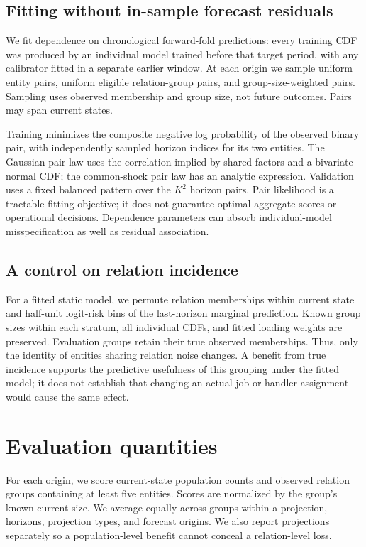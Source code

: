 \subsection{Fitting without in-sample forecast residuals}
We fit dependence on chronological forward-fold predictions: every training
CDF was produced by an individual model trained before that target period,
with any calibrator fitted in a separate earlier window. At each origin we
sample uniform entity pairs, uniform eligible relation-group pairs, and
group-size-weighted pairs. Sampling uses observed membership and group size,
not future outcomes. Pairs may span current states.

Training minimizes the composite negative log probability of the observed
binary pair, with independently sampled horizon indices for its two entities.
The Gaussian pair law uses the correlation implied by shared factors and a
bivariate normal CDF; the common-shock pair law has an analytic expression.
Validation uses a fixed balanced pattern over the $K^2$ horizon pairs. Pair
likelihood is a tractable fitting objective; it does not guarantee optimal
aggregate scores or operational decisions. Dependence parameters can absorb
individual-model misspecification as well as residual association.

\subsection{A control on relation incidence}
For a fitted static model, we permute relation memberships within current state
and half-unit logit-risk bins of the last-horizon marginal prediction. Known
group sizes within each stratum, all individual CDFs, and fitted loading weights
are preserved. Evaluation groups retain their true observed memberships.
Thus, only the identity of entities sharing relation noise changes. A benefit
from true incidence supports the predictive usefulness of this grouping under
the fitted model; it does not establish that changing an actual job or handler
assignment would cause the same effect.

\section{Evaluation quantities}
For each origin, we score current-state population counts and observed relation
groups containing at least five entities. Scores are normalized by the group's
known current size. We average equally across groups within a projection,
horizons, projection types, and forecast origins. We also report projections
separately so a population-level benefit cannot conceal a relation-level loss.


